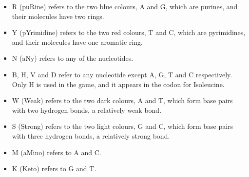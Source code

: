 \documentclass[a4paper,11pt,oneside]{memoir}
\begin{document}

\begin{itemize}
    \item R (puRine) refers to the two blue colours, A and G, which are purines, and their molecules have two rings.
    \item Y (pYrimidine) refers to the two red colours, T and C, which are pyrimidines, and their molecules have one aromatic ring.
    \item N (aNy) refers to any of the nucleotides.
    \item B, H, V and D refer to any nucleotide except A, G, T and C respectively.  Only H is used in the game, and it appears in the codon for Isoleucine.
    \item W (Weak) refers to the two dark colours, A and T, which form base pairs with two hydrogen bonds, a relatively weak bond.
    \item S (Strong) refers to the two light colours, G and C, which form base pairs with three hydrogen bonds, a relatively strong bond.
    \item M (aMino) refers to A and C.
    \item K (Keto) refers to G and T.
\end{itemize}
\end{document}
